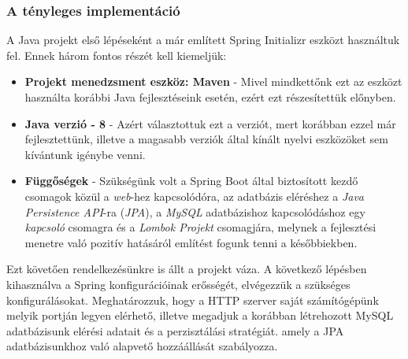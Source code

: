 \documentclass[12pt]{article}
\begin{document}
\subsubsection{A tényleges implementáció}

A Java projekt első lépéseként a már említett Spring Initializr eszközt használtuk fel. Ennek három fontos részét kell kiemeljük:
\begin{itemize}
	\item[]\textbf{Projekt menedzsment eszköz: Maven}
	- Mivel mindkettőnk ezt az eszközt használta korábbi Java fejlesztéseink esetén, ezért ezt részesítettük előnyben.
	\item[]\textbf{Java verzió - 8}
	- Azért választottuk ezt a verziót, mert korábban ezzel már fejlesztettünk, illetve a magasabb verziók által kínált nyelvi eszközöket sem kívántunk igénybe venni.
	\item[]\textbf{Függőségek}
	- Szükségünk volt a Spring Boot által biztosított kezdő csomagok közül a \textit{web}-hez kapcsolódóra, az adatbázis eléréshez a \textit{Java Persistence API}-ra (\textit{JPA}), a \textit{MySQL} adatbázishoz kapcsolódáshoz egy \textit{kapcsoló} csomagra és a \textit{Lombok Projekt} csomagjára, melynek a fejlesztési menetre való pozitív hatásáról említést fogunk tenni a későbbiekben.
\end{itemize}

Ezt követően rendelkezésünkre is állt a projekt váza. A következő lépésben kihasználva a Spring konfigurációinak erősségét, elvégezzük a  szükséges konfigurálásokat. Meghatározzuk, hogy a HTTP szerver saját számítógépünk melyik portján legyen elérhető, illetve megadjuk a korábban létrehozott MySQL adatbázisunk elérési adatait és a perzisztálási stratégiát. amely a JPA adatbázisunkhoz való alapvető hozzáállását szabályozza.
\end{document}
